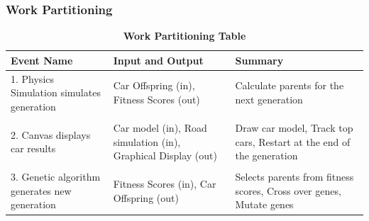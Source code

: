 \documentclass[12pt, titlepage]{article}
\begin{document}
\subsubsection{Work Partitioning}
\begin{table}[H]
\begin{tabularx}{\textwidth}{p{4cm}p{4cm}X}
\toprule {\bf Event Name} & {\bf Input and Output} & {\bf Summary}\\
\midrule
1. Physics Simulation simulates generation & Car Offspring (in), Fitness Scores 
(out) & Calculate parents for the next generation\\
& & \\
2. Canvas displays car results & Car model (in), Road simulation (in), Graphical 
Display (out) & Draw car model, Track top cars, Restart at the end of the 
generation\\
& & \\
3. Genetic algorithm generates new generation & Fitness Scores (in), Car 
Offspring (out) & Selects parents from fitness scores, Cross over genes, Mutate 
genes\\
\bottomrule
\end{tabularx}
\caption{\bf Work Partitioning Table}
\end{table}
\end{document}
